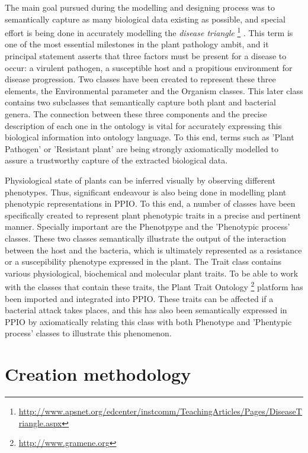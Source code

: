 \documentclass[sw]{iosart2c}
\newcommand{\myurl}[1]{\footnote{\url{#1}}}
\begin{document}
The main goal pursued during the modelling and designing process was to semantically capture as many biological data existing as possible, and special effort is being done in accurately modelling the {\itshape disease triangle} \myurl{http://www.apsnet.org/edcenter/instcomm/TeachingArticles/Pages/DiseaseTriangle.aspx} . This term is one of the most essential milestones in the plant pathology ambit, and it principal statement asserts that three factors must be present for a disease to occur: a virulent pathogen, a susceptible host and a propitious environment for disease progression. Two classes have been created to represent these three elements, the {\sf Environmental parameter} and the {\sf Organism} classes. This later class contains two subclasses that semantically capture both plant and bacterial genera. The connection between these three components and the precise description of each one in the ontology is vital for accurately expressing this biological information into ontology language. To this end, terms such as {\sf 'Plant Pathogen'} or { \sf 'Resistant plant'} are being strongly axiomatically modelled to assure a trustworthy capture of the extracted biological data.

Physiological state of plants can be inferred visually by observing different phenotypes. Thus, significant endeavour is also being done in modelling plant phenotypic representations in PPIO. To this end, a number of classes have been specifically created to represent plant phenotypic traits in a precise and pertinent manner. Specially important are the { \sf Phenotpype} and the {\sf 'Phenotypic process'} classes. These two classes semantically illustrate the output of the interaction between the host and the bacteria, which is ultimately represented as a resistance or a suscepibility phenotype expressed in the plant. The {\sf Trait} class contains various physiological, biochemical and molecular plant traits. To be able to work with the classes that contain these traits, the Plant Trait Ontology \myurl{http://www.gramene.org} platform \cite{PTO} has been imported and integrated into PPIO. These traits can be affected if a bacterial attack takes places, and this has also been semantically expressed in PPIO by axiomatically relating this class with both {\sf Phenotype} and {\sf 'Phentypic process'} classes to illustrate this phenomenon. 


\section{Creation methodology}
\end{document}

